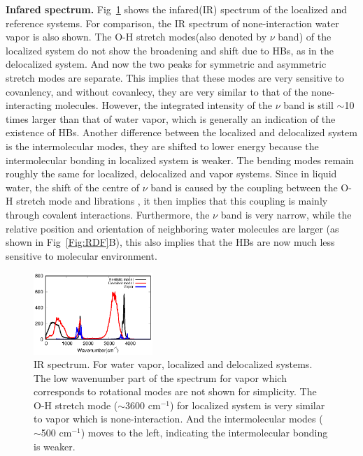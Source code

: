 \documentclass[aps,prl,reprint,amsmath,amssymb]{revtex4-1}
\begin{document}
\textbf{Infared spectrum.} Fig~\ref{Fig:IR} shows the infared(IR) spectrum of the localized and reference systems. For comparison, the IR spectrum of none-interaction water vapor is also shown. The O-H stretch modes(also denoted by $\nu$ band) of the localized system do not show the broadening and shift due to HBs, as in the delocalized system. And now the two peaks for symmetric and asymmetric stretch modes are separate. This implies that these modes are very sensitive to covanlency, and without covanlecy, they are very similar to that of the none-interacting molecules. \new However, the integrated intensity of the $\nu$ band is still $\sim$10 times larger than that of water vapor, which is generally an indication of the existence of HBs. \old Another difference between the localized and delocalized system is the intermolecular modes, they are shifted to lower energy because the intermolecular bonding in localized system is weaker. The bending modes remain roughly the same for localized, delocalized and vapor systems. Since in liquid water, the shift of the centre of $\nu$ band is caused by the coupling between the O-H stretch mode and librations \cite{marechal2006hydrogen}, it then implies that this coupling is mainly through covalent interactions. Furthermore, the $\nu$ band is very narrow, while the relative position and orientation of neighboring water molecules are larger (as shown in Fig~\ref{Fig:RDF}B), this also implies that the HBs are now much less sensitive to molecular environment.

\begin{figure}
\includegraphics[width=0.4\textwidth]{new_ir}
\caption{IR spectrum. For water vapor, localized and delocalized systems. The low wavenumber part of the spectrum for vapor which corresponds to rotational modes are not shown for simplicity.  The O-H stretch mode ($\sim$3600 cm$^{-1}$) for localized system is very similar to vapor which is none-interaction. And the intermolecular modes ($\sim$500 cm$^{-1}$) moves to the left, indicating the intermolecular bonding is weaker. } \label{Fig:IR}
\end{figure}
\end{document}

